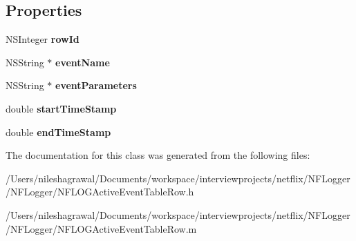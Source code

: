 \subsection*{Properties}
\begin{DoxyCompactItemize}
\item 
\mbox{\label{interface_n_f_l_o_g_active_event_table_row_a1071ef95ec5400434991f648e758f7b4}} 
N\+S\+Integer {\bfseries row\+Id}
\item 
\mbox{\label{interface_n_f_l_o_g_active_event_table_row_a91d6a9d4b6c714225c3b2af07ec113b5}} 
N\+S\+String $\ast$ {\bfseries event\+Name}
\item 
\mbox{\label{interface_n_f_l_o_g_active_event_table_row_abec94806eff80d4c4f042b54b7f6a97c}} 
N\+S\+String $\ast$ {\bfseries event\+Parameters}
\item 
\mbox{\label{interface_n_f_l_o_g_active_event_table_row_acf4f5f446612378d259babc7be21a0d2}} 
double {\bfseries start\+Time\+Stamp}
\item 
\mbox{\label{interface_n_f_l_o_g_active_event_table_row_a0737860a7a6f5ea883b750305613d267}} 
double {\bfseries end\+Time\+Stamp}
\end{DoxyCompactItemize}


The documentation for this class was generated from the following files\+:\begin{DoxyCompactItemize}
\item 
/\+Users/nileshagrawal/\+Documents/workspace/interviewprojects/netflix/\+N\+F\+Logger/\+N\+F\+Logger/N\+F\+L\+O\+G\+Active\+Event\+Table\+Row.\+h\item 
/\+Users/nileshagrawal/\+Documents/workspace/interviewprojects/netflix/\+N\+F\+Logger/\+N\+F\+Logger/N\+F\+L\+O\+G\+Active\+Event\+Table\+Row.\+m\end{DoxyCompactItemize}
